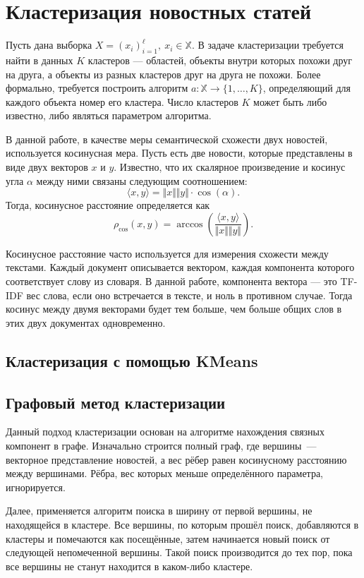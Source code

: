 \documentclass[a4paper, 14pt]{extarticle}
\begin{document}
\section{Кластеризация новостных статей}
Пусть дана выборка $X = (x_i)_{i=1}^{\ell}, \ x_i \in \mathbb{X}$. В задаче кластеризации требуется найти в данных
$K$ кластеров --- областей, объекты внутри которых похожи друг на друга, а объекты из разных кластеров друг на друга не похожи.
Более формально, требуется построить алгоритм $a : \mathbb{X} \to \{1, \dots, K\}$, определяющий для каждого объекта номер его кластера.
Число кластеров $K$ может быть либо известно, либо являться параметром алгоритма.

В данной работе, в качестве меры семантической схожести двух новостей, используется косинусная мера.
Пусть есть две новости, которые представлены в виде двух векторов $x$ и $y$. Известно, что их скалярное произведение
и косинус угла $\alpha$ между ними связаны следующим соотношением:
$$
\langle x,y \rangle = \Vert x \Vert \Vert y \Vert \cdot \cos(\alpha).
$$
Тогда, косинусное расстояние определяется как
$$
\rho_{\cos}(x, y) = \arccos\left(\frac{\langle x,y \rangle}{\Vert x \Vert \Vert y \Vert} \right).
$$

Косинусное расстояние часто используется для измерения схожести между текстами.
Каждый документ описывается вектором, каждая компонента которого соответствует слову из словаря. В данной работе, компонента
вектора --- это TF-IDF вес слова, если оно встречается в тексте, и ноль в противном случае.
Тогда косинус между двумя векторами будет тем больше, чем больше общих слов в этих двух документах одновременно.

\subsection{Кластеризация с помощью KMeans}
\subsection{Графовый метод кластеризации}
Данный подход кластеризации основан на алгоритме нахождения связных компонент в графе. Изначально строится полный граф,
где вершины~--- векторное представление новостей, а вес рёбер равен косинусному расстоянию между вершинами.
Рёбра, вес которых меньше определённого параметра, игнорируется.

Далее, применяется алгоритм поиска в ширину от первой вершины, не находящейся в кластере. Все вершины, по которым прошёл поиск, добавляются
в кластеры и помечаются как посещённые, затем начинается новый поиск от следующей непомеченной вершины.
Такой поиск производится до тех пор, пока все вершины не станут находится в каком-либо кластере.
\end{document}
